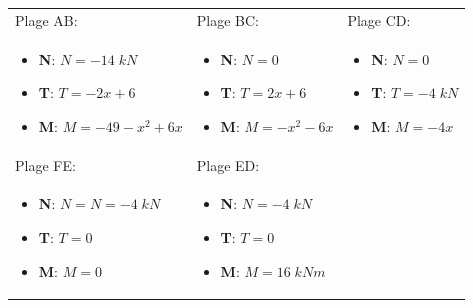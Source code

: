 \documentclass[a4paper]{article}
\begin{document}
\begin{tabular}{p{5cm}p{5cm}p{5cm}}

Plage AB: & Plage BC: & Plage CD: \\
\begin{itemize}
    \item \textbf{N}: $ N = - 14 \; kN $
    \item \textbf{T}: $ T = - 2 x + 6 $
    \item \textbf{M}: $ M = -49 - x^2 + 6 x $
\end{itemize}
&
\begin{itemize}
    \item \textbf{N}: $ N = 0 $
    \item \textbf{T}: $ T = 2 x + 6 $
    \item \textbf{M}: $ M = - x^2 - 6 x $
\end{itemize}
&
\begin{itemize}
    \item \textbf{N}: $ N = 0 $
    \item \textbf{T}: $ T = - 4 \; kN $
    \item \textbf{M}: $ M = - 4 x $
\end{itemize}
\\
Plage FE: & Plage ED: & \\
\begin{itemize}
    \item \textbf{N}: $ N = N = - 4 \; kN $
    \item \textbf{T}: $ T = 0 $
    \item \textbf{M}: $ M = 0 $
\end{itemize}
&
\begin{itemize}
    \item \textbf{N}: $ N = - 4 \; kN $
    \item \textbf{T}: $ T = 0 $
    \item \textbf{M}: $ M = 16 \; kN m $
\end{itemize}
\end{tabular}
\end{document}
